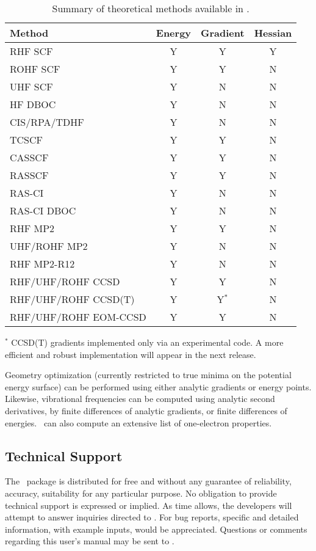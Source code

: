 \begin{table}
\caption{Summary of theoretical methods available in \PSIfour.} \label{table:methods}
\parsep 10pt
\begin{center}
\begin{tabular}{lccc} \hline\hline
Method                & Energy & Gradient & Hessian \\ \hline
RHF SCF               & Y & Y & Y \\
ROHF SCF              & Y & Y & N \\
UHF SCF               & Y & N & N \\
HF DBOC               & Y & N & N \\
CIS/RPA/TDHF          & Y & N & N \\
TCSCF                 & Y & Y & N \\
CASSCF                & Y & Y & N \\
RASSCF                & Y & Y & N \\
RAS-CI                & Y & N & N \\
RAS-CI DBOC           & Y & N & N \\
RHF MP2               & Y & Y & N \\
UHF/ROHF MP2          & Y & N & N \\
RHF MP2-R12           & Y & N & N \\
RHF/UHF/ROHF CCSD     & Y & Y & N \\
RHF/UHF/ROHF CCSD(T)  & Y & Y$^*$ & N \\
RHF/UHF/ROHF EOM-CCSD & Y & Y & N \\
\hline\hline
\end{tabular}
\end{center}
\footnotesize{$^*$ CCSD(T) gradients implemented only via an experimental
code.  A more efficient and robust implementation will appear in the next
release.}
\end{table}
Geometry optimization (currently restricted to true minima on the potential
energy surface) can be performed using either analytic gradients
or energy points.  Likewise, vibrational frequencies can be 
computed using analytic second derivatives, by finite
differences of analytic gradients, or finite differences of energies.
\PSIfour\ can also compute an extensive list of one-electron properties.

\subsection{Technical Support} The \PSIfour\ package is
distributed for free and without any guarantee of reliability,
accuracy, suitability for any particular purpose.  No obligation
to provide technical support is expressed or implied.  As time
allows, the developers will attempt to answer inquiries directed to
.
For bug reports, specific and detailed information, with example
inputs, would be appreciated.  Questions or comments regarding
this user's manual may be sent to .



